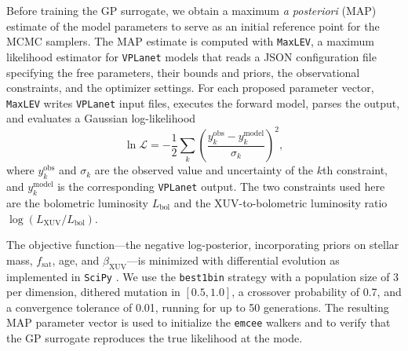 Before training the GP surrogate, we obtain a maximum \emph{a
posteriori} (MAP) estimate of the model parameters to serve as an
initial reference point for the MCMC samplers. The MAP estimate is
computed with \texttt{MaxLEV}, a maximum likelihood estimator for
\texttt{VPLanet} models that reads a JSON configuration file
specifying the free parameters, their bounds and priors, the
observational constraints, and the optimizer settings. For each
proposed parameter vector, \texttt{MaxLEV} writes \texttt{VPLanet}
input files, executes the forward model, parses the output, and
evaluates a Gaussian log-likelihood
\begin{equation}
  \ln\mathcal{L} = -\frac{1}{2}\sum_{k}
  \left(\frac{y_{k}^{\mathrm{obs}} - y_{k}^{\mathrm{model}}}
  {\sigma_{k}}\right)^{2},
  \label{eq:loglike}
\end{equation}
where $y_{k}^{\mathrm{obs}}$ and $\sigma_{k}$ are the observed value
and uncertainty of the $k$th constraint, and
$y_{k}^{\mathrm{model}}$ is the corresponding \texttt{VPLanet} output.
The two constraints used here are the bolometric luminosity
$L_{\mathrm{bol}}$ and the XUV-to-bolometric luminosity ratio
$\log(L_{\mathrm{XUV}}/L_{\mathrm{bol}})$.

The objective function---the negative log-posterior, incorporating
priors on stellar mass, $f_{\mathrm{sat}}$, age, and
$\beta_{\mathrm{XUV}}$---is minimized with differential evolution
\citep{StornPrice97} as implemented in \texttt{SciPy}
\citep{Virtanen20}. We use the \texttt{best1bin} strategy with a
population size of 3 per dimension, dithered mutation in $[0.5, 1.0]$,
a crossover probability of 0.7, and a convergence tolerance of 0.01,
running for up to 50 generations. The resulting MAP parameter vector
is used to initialize the \texttt{emcee} walkers and to verify that
the GP surrogate reproduces the true likelihood at the mode.

